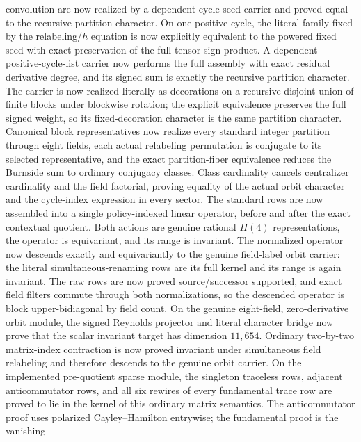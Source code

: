 \documentclass[11pt]{article}
\theoremstyle{definition}
\begin{document}
\begin{itemize}
    convolution are now realized by a dependent cycle-seed carrier and proved
    equal to the recursive partition character.  On one positive cycle, the
    literal family fixed by the relabeling/$h$ equation is now explicitly
    equivalent to the powered fixed seed with exact preservation of the full
    tensor-sign product.  A dependent positive-cycle-list carrier now performs
    the full assembly with exact residual derivative degree, and its signed
    sum is exactly the recursive partition character.  The carrier is now
    realized literally as decorations on a recursive disjoint union of finite
    blocks under blockwise rotation; the explicit equivalence preserves the
    full signed weight, so its fixed-decoration character is the same
    partition character.  Canonical block representatives now realize every
    standard integer partition through eight fields, each actual relabeling
    permutation is conjugate to its selected representative, and the exact
    partition-fiber equivalence reduces the Burnside sum to ordinary
    conjugacy classes.  Class cardinality cancels centralizer cardinality and
    the field factorial, proving equality of the actual orbit character and
    the cycle-index expression in every sector.
    The standard rows are now assembled into a single policy-indexed linear
    operator, before and after the exact contextual quotient.  Both actions
    are genuine rational $H(4)$ representations, the operator is equivariant,
    and its range is invariant.  The normalized operator now descends
    exactly and equivariantly to the genuine field-label orbit carrier: the
    literal simultaneous-renaming rows are its full kernel and its range is
    again invariant.  The raw rows are now proved source/successor supported,
    and exact field filters commute through both normalizations, so the
    descended operator is block upper-bidiagonal by field count.  On the
    genuine eight-field, zero-derivative orbit module, the signed Reynolds
    projector and literal character bridge now prove that the scalar
    invariant target has dimension $11{,}654$.  Ordinary two-by-two
    matrix-index contraction is now proved invariant under simultaneous
    field relabeling and therefore descends to the genuine orbit carrier.
    On the implemented pre-quotient sparse module, the singleton traceless
    rows, adjacent anticommutator rows, and all six rewires of every
    fundamental trace row are proved to lie in the kernel of this ordinary
    matrix semantics.  The anticommutator proof uses polarized
    Cayley--Hamilton entrywise; the fundamental proof is the vanishing

\end{itemize}
\end{document}
